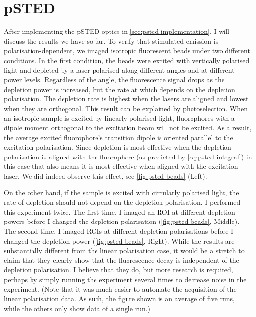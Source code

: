 \section{pSTED}

After implementing the pSTED optics in \autoref{sec:psted implementation}, I will discuss the results we have so far. To verify that stimulated emission is polarisation-dependent, we imaged isotropic fluorescent beads under two different conditions. In the first condition, the beads were excited with vertically polarised light and depleted by a laser polarised along different angles and at different power levels. Regardless of the angle, the fluorescence signal drops as the depletion power is increased, but the rate at which depends on the depletion polarisation. The depletion rate is highest when the lasers are aligned and lowest when they are orthogonal. This result can be explained by photoselection. When an isotropic sample is excited by linearly polarised light, fluorophores with a dipole moment orthogonal to the excitation beam will not be excited. As a result, the average excited fluorophore's transition dipole is oriented parallel to the excitation polarisation. Since depletion is most effective when the depletion polarisation is aligned with the fluorophore (as predicted by \autoref{eq:psted integral}) in this case that also means it is most effective when aligned with the excitation laser. We did indeed observe this effect, see \autoref{fig:psted beads} (Left). 

On the other hand, if the sample is excited with circularly polarised light, the rate of depletion should not depend on the depletion polarisation. I performed this experiment twice. The first time, I imaged an ROI at different depletion powers before I changed the depletion polarisation (\autoref{fig:psted beads}, Middle). The second time, I imaged ROIs at different depletion polarisations before I changed the depletion power (\autoref{fig:psted beads}, Right). While the results are substantially different from the linear polarisation case, it would be a stretch to claim that they clearly show that the fluorescence decay is independent of the depletion polarisation. I believe that they do, but more research is required, perhaps by simply running the experiment several times to decrease noise in the experiment. (Note that it was much easier to automate the acquisition of the linear polarisation data. As such, the figure shown is an average of five runs, while the others only show data of a single run.)

